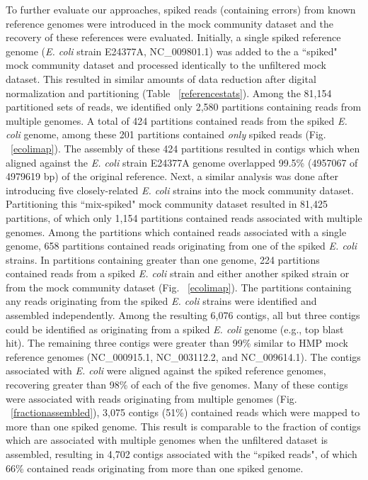 \documentclass[11pt]{article} %
\begin{document}
To further evaluate our approaches, spiked reads (containing errors) from known reference genomes were introduced in the mock community dataset and the recovery of these references were evaluated.  Initially, a single  spiked reference genome (\emph{E. coli} strain E24377A, NC\_009801.1) was added to the  a ``spiked" mock community dataset and processed identically to the unfiltered mock dataset.  This resulted in similar amounts of data reduction after digital normalization and partitioning (Table ~\ref{referencestats}).  Among the 81,154 partitioned sets of reads, we identified only 2,580 partitions containing reads from multiple genomes.  A total of 424 partitions contained reads from the spiked \emph{E. coli} genome, among these 201 partitions contained \emph{only} spiked reads (Fig. ~\ref{ecolimap}).  The assembly of these 424 partitions resulted in contigs which when aligned against the \emph{E. coli} strain E24377A genome overlapped 99.5\% (4957067 of 4979619 bp) of the original reference.  Next, a similar analysis was done after introducing five closely-related \emph{E. coli} strains into the mock community dataset.  Partitioning this ``mix-spiked" mock community dataset resulted in 81,425 partitions, of which only 1,154 partitions contained reads associated with multiple genomes.  Among the partitions which contained reads associated with a single genome, 658 partitions contained reads originating from one of the spiked \emph{E. coli} strains.  In partitions containing greater than one genome, 224 partitions contained reads from a spiked \emph{E. coli} strain and either another spiked strain or from the mock community dataset (Fig. ~\ref{ecolimap}).  The partitions containing any reads originating from the spiked \emph{E. coli} strains were identified and assembled independently.  Among the resulting 6,076 contigs, all but three contigs could be identified as originating from a spiked \emph{E. coli} genome (e.g., top blast hit).  The remaining three contigs were greater than 99\% similar to HMP mock reference genomes (NC\_000915.1, NC\_003112.2, and NC\_009614.1).  The contigs associated with \emph{E. coli} were aligned against the spiked reference genomes, recovering greater than 98\% of each of the five genomes.  Many of these contigs were associated with reads originating from multiple genomes (Fig. ~\ref{fractionassembled}), 3,075 contigs (51\%) contained reads which were mapped to more than one spiked genome.  This result is comparable to the fraction of contigs which are associated with multiple genomes when the unfiltered dataset is assembled, resulting in 4,702 contigs associated with the ``spiked reads", of which 66\% contained reads originating from more than one spiked genome.
\end{document}
